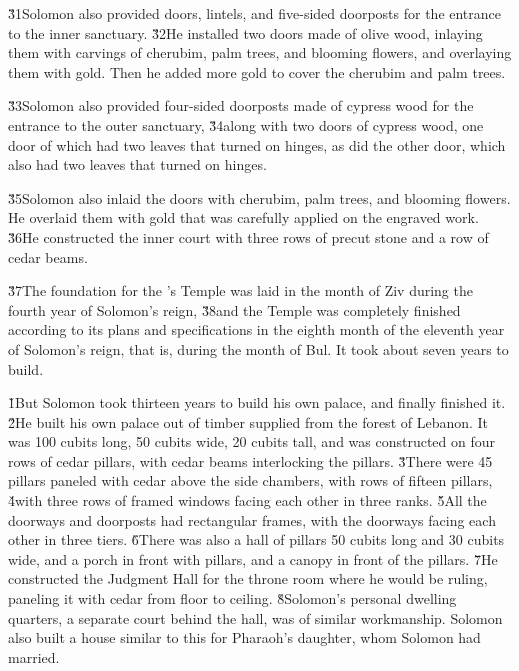 \v{31}Solomon also provided doors, lintels, and five-sided doorposts for the entrance to the inner sanctuary. \v{32}He installed two doors made of olive wood, inlaying them with carvings of cherubim, palm trees, and blooming flowers, and overlaying them with gold. Then he added more gold to cover the cherubim and palm trees.

\v{33}Solomon also provided four-sided doorposts made of cypress wood for the entrance to the outer sanctuary, \v{34}along with two doors of cypress wood, one door of which had two leaves that turned on hinges, as did the other door, which also had two leaves that turned on hinges.

\v{35}Solomon also inlaid the doors with cherubim, palm trees, and blooming flowers. He overlaid them with gold that was carefully applied on the engraved work. \v{36}He constructed the inner court with three rows of precut stone and a row of cedar beams.

\v{37}The foundation for the 's Temple was laid in the month of Ziv during the fourth year of Solomon's reign, \v{38}and the Temple was completely finished according to its plans and specifications in the eighth month of the eleventh year of Solomon's reign, that is, during the month of Bul. It took about seven years to build.

\v{1}But Solomon took thirteen years to build his own palace, and finally finished it. \v{2}He built his own palace out of timber supplied from the forest of Lebanon. It was 100 cubits long, 50 cubits wide, 20 cubits tall, and was constructed on four rows of cedar pillars, with cedar beams interlocking the pillars. \v{3}There were 45 pillars paneled with cedar above the side chambers, with rows of fifteen pillars, \v{4}with three rows of framed windows facing each other in three ranks. \v{5}All the doorways and doorposts had rectangular frames, with the doorways facing each other in three tiers. \v{6}There was also a hall of pillars 50 cubits long and 30 cubits wide, and a porch in front with pillars, and a canopy in front of the pillars. \v{7}He constructed the Judgment Hall for the throne room where he would be ruling, paneling it with cedar from floor to ceiling. \v{8}Solomon's personal dwelling quarters, a separate court behind the hall, was of similar workmanship. Solomon also built a house similar to this for Pharaoh's daughter, whom Solomon had married.

